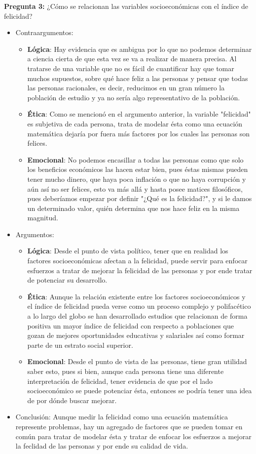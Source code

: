 \documentclass[12pt,oneside,letterpaper,spanish]{article}
\begin{document}
\newpage
\textbf{Pregunta 3:} ¿Cómo se relacionan las variables socioeconómicas con el índice de felicidad?
\begin{itemize}
    \item Contraargumentos:
    \begin{itemize}
        \item \textbf{Lógica}: Hay evidencia que es ambigua por lo que no podemos determinar a ciencia cierta de que esta vez se va a realizar de manera precisa. Al tratarse de una variable que no es fácil de cuantificar hay que tomar muchos supuestos, sobre qué hace feliz a las personas y pensar que todas las personas racionales, es decir, reducimos en un gran número la población de estudio y ya no sería algo representativo de la población.
        \item \textbf{Ética}: Como se mencionó en el argumento anterior, la variable "felicidad" es subjetiva de cada persona, trata de modelar ésta como una ecuación matemática dejaría por fuera más factores por los cuales las personas son felices. 
        \item \textbf{Emocional}: No podemos encasillar a todas las personas como que solo los beneficios económicos las hacen estar bien, pues éstas mismas pueden tener mucho dinero, que haya poca inflación o que no haya corrupción y aún así no ser felices, esto va más allá y hasta posee matices filosóficos, pues deberíamos empezar por definir "¿Qué es la felicidad?", y si le damos un determinado valor, quién determina que nos hace feliz en la misma magnitud.
    \end{itemize}
    \item Argumentos:
    \begin{itemize}
        \item \textbf{Lógica}: Desde el punto de vista político, tener que en realidad los factores socioeconómicas afectan a la felicidad, puede servir para enfocar esfuerzos a tratar de mejorar la felicidad de las personas y por ende tratar de potenciar su desarrollo. 
        \item \textbf{Ética}: Aunque la relación existente entre los factores socioeconómicos y el índice de felicidad pueda verse como un proceso complejo y  polifacético a lo largo del globo se han desarrollado estudios que relacionan de forma positiva un mayor índice de felicidad con respecto a poblaciones que gozan de mejores oportunidades educativas y salariales así como formar parte de un estrato social superior. 
        \item \textbf{Emocional}: Desde el punto de vista de las personas, tiene gran utilidad saber esto, pues si bien, aunque cada persona tiene una diferente interpretación de felicidad, tener evidencia de que por el lado socioeconómico se puede potenciar ésta, entonces se podría tener una idea de por dónde buscar mejorar.
    \end{itemize}
    \item Conclusión: Aunque medir la felicidad como una ecuación matemática represente problemas, hay un agregado de factores que se pueden tomar en común para tratar de modelar ésta y tratar de enfocar los esfuerzos a mejorar la feclidad de las personas y por ende su calidad de vida.
\end{itemize}
\end{document}
